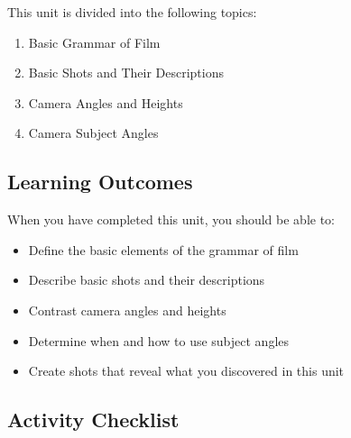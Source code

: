 \documentclass[
]{book}
\providecommand{\tightlist}{%
  \setlength{\itemsep}{0pt}\setlength{\parskip}{0pt}}
\begin{document}
This unit is divided into the following topics:

\begin{enumerate}
\def\labelenumi{\arabic{enumi}.}
\tightlist
\item
  Basic Grammar of Film\\
\item
  Basic Shots and Their Descriptions\\
\item
  Camera Angles and Heights\\
\item
  Camera Subject Angles
\end{enumerate}

\hypertarget{learning-outcomes-4}{%
\subsection*{Learning Outcomes}\label{learning-outcomes-4}}

When you have completed this unit, you should be able to:

\begin{itemize}
\tightlist
\item
  Define the basic elements of the grammar of film\\
\item
  Describe basic shots and their descriptions\\
\item
  Contrast camera angles and heights\\
\item
  Determine when and how to use subject angles\\
\item
  Create shots that reveal what you discovered in this unit
\end{itemize}

\hypertarget{activity-checklist-4}{%
\subsection*{Activity Checklist}\label{activity-checklist-4}}
\end{document}

